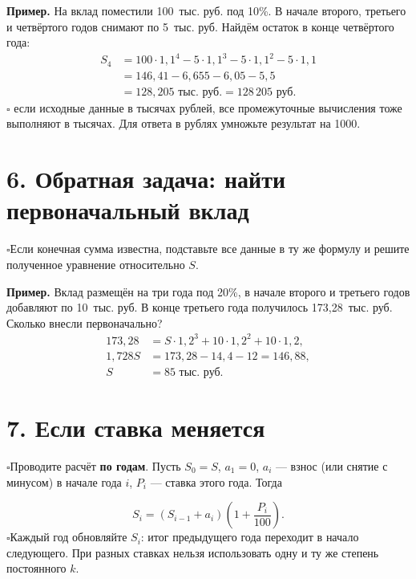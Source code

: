 \documentclass[a4paper,12pt]{article}
\newcommand{\checkitem}[1]{\noindent\(\square\)\enspace #1\par}
\newcommand{\keyterm}[1]{{\color{darkaccent}\textbf{#1}}}
\newcommand{\smallrule}{\par\vspace{.15em}{\color{lightline}\rule{\linewidth}{.35pt}}\vspace{.15em}}
\begin{document}
\textbf{Пример.} На вклад поместили 100~тыс. руб. под 10\%. В начале второго, третьего и четвёртого годов снимают по 5~тыс. руб. Найдём остаток в конце четвёртого года:
\[
\begin{aligned}
S_4&=100\cdot1{,}1^4-5\cdot1{,}1^3
 -5\cdot1{,}1^2-5\cdot1{,}1\\
&=146{,}41-6{,}655-6{,}05-5{,}5\\
&=128{,}205\text{ тыс. руб.}
=\boxed{128\,205\text{ руб.}}
\end{aligned}
\]
\checkitem{\keyterm{Единицы измерения:} если исходные данные в тысячах рублей, все промежуточные вычисления тоже выполняют в тысячах. Для ответа в рублях умножьте результат на 1000.}

\smallrule
\section*{6. Обратная задача: найти первоначальный вклад}
\checkitem{Если конечная сумма известна, подставьте все данные в ту же формулу и решите полученное уравнение относительно \(S\).}

\textbf{Пример.} Вклад размещён на три года под 20\%, в начале второго и третьего годов добавляют по 10~тыс. руб. В конце третьего года получилось 173{,}28~тыс. руб. Сколько внесли первоначально?
\[
\begin{aligned}
173{,}28&=S\cdot1{,}2^3+10\cdot1{,}2^2+10\cdot1{,}2,\\
1{,}728S&=173{,}28-14{,}4-12=146{,}88,\\
S&=\boxed{85\text{ тыс. руб.}}
\end{aligned}
\]

\section*{7. Если ставка меняется}
\checkitem{Проводите расчёт \keyterm{по годам}. Пусть \(S_0=S\), \(a_1=0\), \(a_i\) --- взнос (или снятие с минусом) в начале года \(i\), \(P_i\) --- ставка этого года. Тогда}
\[
\boxed{S_i=(S_{i-1}+a_i)\left(1+\frac{P_i}{100}\right).}
\]
\checkitem{Каждый год обновляйте \(S_i\): итог предыдущего года переходит в начало следующего. При разных ставках нельзя использовать одну и ту же степень постоянного \(k\).}
\end{document}
